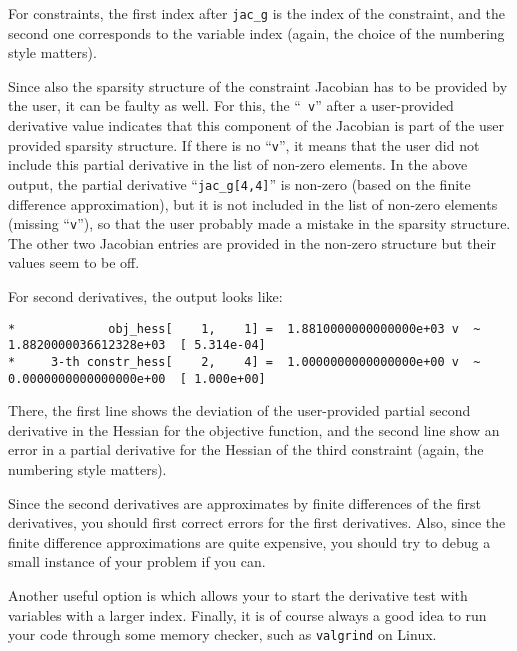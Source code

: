 \documentclass[10pt]{article}
\begin{document}
For constraints, the first index after {\tt jac\_g} is the index of
the constraint, and the second one corresponds to the variable index
(again, the choice of the numbering style matters).

Since also the sparsity structure of the constraint Jacobian has to be
provided by the user, it can be faulty as well.  For this, the ``{\tt
  v}'' after a user-provided derivative value indicates that this
component of the Jacobian is part of the user provided sparsity
structure.  If there is no ``{\tt v}'', it means that the user did not
include this partial derivative in the list of non-zero elements.  In
the above output, the partial derivative ``{\tt jac\_g[4,4]}'' is
non-zero (based on the finite difference approximation), but it is not
included in the list of non-zero elements (missing ``{\tt v}''), so
that the user probably made a mistake in the sparsity structure.  The
other two Jacobian entries are provided in the non-zero structure but
their values seem to be off.

For second derivatives, the output looks like:

\begin{footnotesize}
\begin{verbatim}
*             obj_hess[    1,    1] =  1.8810000000000000e+03 v  ~  1.8820000036612328e+03  [ 5.314e-04]
*     3-th constr_hess[    2,    4] =  1.0000000000000000e+00 v  ~  0.0000000000000000e+00  [ 1.000e+00]
\end{verbatim}
\end{footnotesize}

There, the first line shows the deviation of the user-provided partial
second derivative in the Hessian for the objective function, and the
second line show an error in a partial derivative for the Hessian of
the third constraint (again, the numbering style matters).

Since the second derivatives are approximates by finite differences of
the first derivatives, you should first correct errors for the first
derivatives.  Also, since the finite difference approximations are
quite expensive, you should try to debug a small instance of your
problem if you can.  

Another useful option is 
which allows your to start the derivative test with variables with a larger
index.
%
Finally, it is of course always a good idea to run your code through
some memory checker, such as {\tt valgrind} on Linux.
\end{document}
